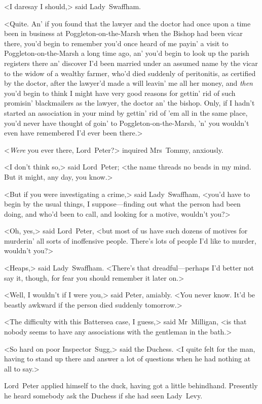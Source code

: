 <I daresay I should,> said Lady~Swaffham.

<Quite. An' if you found that the lawyer and the doctor had once upon a time been in business at Poggleton-on-the-Marsh when the Bishop had been vicar there, you'd begin to remember you'd once heard of me payin' a visit to Poggleton-on-the-Marsh a long time ago, an' you'd begin to look up the parish registers there an' discover I'd been married under an assumed name by the vicar to the widow of a wealthy farmer, who'd died suddenly of peritonitis, as certified by the doctor, after the lawyer'd made a will leavin' me all her money, and \emph{then} you'd begin to think I might have very good reasons for gettin' rid of such promisin' blackmailers as the lawyer, the doctor an' the bishop. Only, if I hadn't started an association in your mind by gettin' rid of 'em all in the same place, you'd never have thought of goin' to Poggleton-on-the-Marsh, 'n' you wouldn't even have remembered I'd ever been there.>

<\emph{Were} you ever there, Lord~Peter?> inquired Mrs~Tommy, anxiously.

<I don't think so,> said Lord~Peter; <the name threads no beads in my mind. But it might, any day, you know.>

<But if you were investigating a crime,> said Lady~Swaffham, <you'd have to begin by the usual things, I suppose—finding out what the person had been doing, and who'd been to call, and looking for a motive, wouldn't you?>

<Oh, yes,> said Lord~Peter, <but most of us have such dozens of motives for murderin' all sorts of inoffensive people. There's lots of people I'd like to murder, wouldn't you?>

<Heaps,> said Lady~Swaffham. <There's that dreadful—perhaps I'd better not say it, though, for fear you should remember it later on.>

<Well, I wouldn't if I were you,> said Peter, amiably. <You never know. It'd be beastly awkward if the person died suddenly tomorrow.>

<The difficulty with this Battersea case, I guess,> said Mr~Milligan, <is that nobody seems to have any associations with the gentleman in the bath.>

<So hard on poor Inspector~Sugg,> said the Duchess. <I quite felt for the man, having to stand up there and answer a lot of questions when he had nothing at all to say.>

Lord~Peter applied himself to the duck, having got a little behindhand. Presently he heard somebody ask the Duchess if she had seen Lady~Levy.

